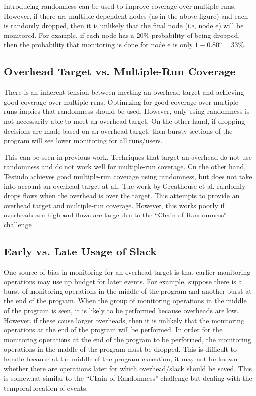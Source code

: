 \documentclass[11pt, letterpaper]{article}
\providecommand{\dotgraph}[2]{
    \vspace{-0.6in}
    \begin{center}
    \digraph[scale=0.75]{#1}{#2}
    \end{center}
    \vspace{-0.6in}
  }
\begin{document}
\dotgraph{random_chain}{
  rankdir=LR; a->b; b->c; c->d; d->e;
}
Introducing randomness can be used to improve coverage over multiple runs.
However, if there are multiple dependent nodes (as in the above figure) and
each is randomly dropped, then it is unlikely that the final node (i.e, node e)
will be monitored. For example, if each node has a 20\% probability of being
dropped, then the probability that monitoring is done for node e is only
$1-0.80^5 = 33\%$.

\subsection{Overhead Target vs. Multiple-Run Coverage}
There is an inherent tension between meeting an overhead target and achieving
good coverage over multiple runs. Optimizing for good coverage over multiple
runs implies that randomness should be used. However, only using randomness is
not necessarily able to meet an overhead target. On the other hand, if dropping
decisions are made based on an overhead target, then bursty sections of the
program will see lower monitoring for all runs/users.

This can be seen in previous work. Techniques that target an overhead do not
use randomness and do not work well for multiple-run coverage. On the other
hand, Testudo achieves good multiple-run coverage using randomness, but does
not take into account an overhead target at all. The work by Greathouse et al.
randomly drops flows when the overhead is over the target. This attempts to
provide an overhead target and multiple-run coverage. However, this works
poorly if overheads are high and flows are large due to the ``Chain of
Randomness'' challenge.

\subsection{Early vs. Late Usage of Slack}
One source of bias in monitoring for an overhead target is that earlier
monitoring operations may use up budget for later events. For example, suppose
there is a burst of monitoring operations in the middle of the program and
another burst at the end of the program. When the group of monitoring
operations in the middle of the program is seen, it is likely to be performed
because overheads are low. However, if these cause larger overheads, then it is
unlikely that the monitoring operations at the end of the program will be
performed. In order for the monitoring operations at the end of the program to
be performed, the monitoring operations in the middle of the program must be
dropped. This is difficult to handle because at the middle of the program
execution, it may not be known whether there are operations later for which
overhead/slack should be saved. This is somewhat similar to the ``Chain of
Randomness'' challenge but dealing with the temporal location of events.
\end{document}
